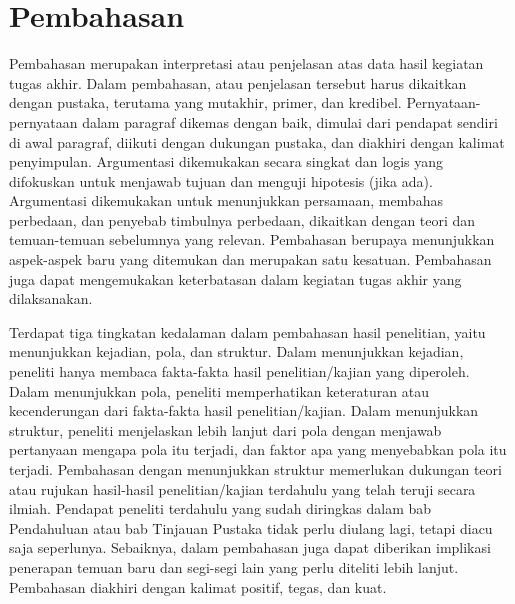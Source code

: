 \vspace{13pt}

\section{Pembahasan}

Pembahasan merupakan interpretasi atau penjelasan atas data hasil kegiatan
tugas akhir. Dalam pembahasan, atau penjelasan tersebut harus dikaitkan dengan
pustaka, terutama yang mutakhir, primer, dan kredibel. Pernyataan-pernyataan
dalam paragraf dikemas dengan baik, dimulai dari pendapat sendiri di awal
paragraf, diikuti dengan dukungan pustaka, dan diakhiri dengan kalimat
penyimpulan. Argumentasi dikemukakan secara singkat dan logis yang difokuskan
untuk menjawab tujuan dan menguji hipotesis (jika ada). Argumentasi dikemukakan
untuk menunjukkan persamaan, membahas perbedaan, dan penyebab timbulnya
perbedaan, dikaitkan dengan teori dan temuan-temuan sebelumnya yang relevan.
Pembahasan berupaya menunjukkan aspek-aspek baru yang ditemukan dan merupakan
satu kesatuan. Pembahasan juga dapat mengemukakan keterbatasan dalam kegiatan
tugas akhir yang dilaksanakan.

Terdapat tiga tingkatan kedalaman dalam pembahasan hasil penelitian, yaitu
menunjukkan kejadian, pola, dan struktur. Dalam menunjukkan kejadian, peneliti
hanya membaca fakta-fakta hasil penelitian/kajian yang diperoleh. Dalam
menunjukkan pola, peneliti memperhatikan keteraturan atau kecenderungan dari
fakta-fakta hasil penelitian/kajian. Dalam menunjukkan struktur, peneliti
menjelaskan lebih lanjut dari pola dengan menjawab pertanyaan mengapa pola itu
terjadi, dan faktor apa yang menyebabkan pola itu terjadi. Pembahasan dengan
menunjukkan struktur memerlukan dukungan teori atau rujukan hasil-hasil
penelitian/kajian terdahulu yang telah teruji secara ilmiah. Pendapat peneliti
terdahulu yang sudah diringkas dalam bab Pendahuluan atau bab Tinjauan Pustaka
tidak perlu diulang lagi, tetapi diacu saja seperlunya. Sebaiknya, dalam
pembahasan juga dapat diberikan implikasi penerapan temuan baru dan segi-segi
lain yang perlu diteliti lebih lanjut. Pembahasan diakhiri dengan kalimat
positif, tegas, dan kuat.

